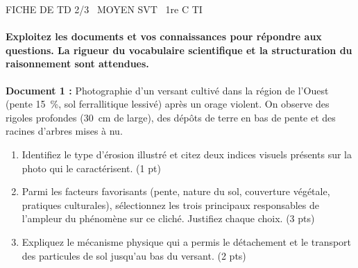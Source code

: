 \documentclass[11pt]{article}
\begin{document}
\begin{tcolorbox}[enhanced,colback=popink,colframe=popink,arc=10pt,boxrule=0pt,left=12pt,right=12pt,top=9pt,bottom=9pt]
{\color{white}\popxbold\small FICHE DE TD 2/3 \textbullet\ MOYEN \hfill SVT \textbullet\ 1re C TI\par}
\end{tcolorbox}
\vspace{4pt}
\paragraph{Exploitez les documents et vos connaissances pour répondre aux questions. La rigueur du vocabulaire scientifique et la structuration du raisonnement sont attendues.}

\begin{exercice}
\textbf{Document 1 :} Photographie d'un versant cultivé dans la région de l'Ouest (pente \SI{15}{\percent}, sol ferrallitique lessivé) après un orage violent. On observe des rigoles profondes (\SI{30}{\centi\meter} de large), des dépôts de terre en bas de pente et des racines d'arbres mises à nu.
\begin{enumerate}
    \item Identifiez le type d'érosion illustré et citez deux indices visuels présents sur la photo qui le caractérisent. (1 pt)
    \item Parmi les facteurs favorisants (pente, nature du sol, couverture végétale, pratiques culturales), sélectionnez les trois principaux responsables de l'ampleur du phénomène sur ce cliché. Justifiez chaque choix. (3 pts)
    \item Expliquez le mécanisme physique qui a permis le détachement et le transport des particules de sol jusqu'au bas du versant. (2 pts)
\end{enumerate}
\end{exercice}
\end{document}
